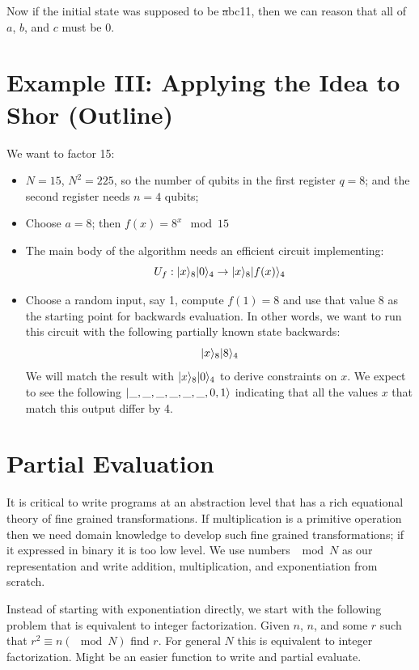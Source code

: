 \documentclass{article}
\begin{document}
Now if the initial state was supposed to be \st{a}{b}{c}{1}{1}, then we
can reason that all of $a$, $b$, and $c$ must be 0.

\section{Example III: Applying the Idea to Shor (Outline)}

We want to factor 15:
\begin{itemize}
\item $N = 15$, $N^2 = 225$, so the number of qubits in the first
  register $q=8$; and the second register needs $n=4$ qubits;
\item Choose $a=8$; then $f(x) = 8^x \mod{15}$
\item The main body of the algorithm needs an efficient circuit implementing:
  \[
  U_f : | x \rangle_8| 0 \rangle_4 \rightarrow | x \rangle_8| f(x) \rangle_4
  \]
\item Choose a random input, say 1, compute $f(1) = 8$ and use that
  value 8 as the starting point for backwards evaluation. In other
  words, we want to run this circuit with the following partially
  known state backwards:
  \[
  | x \rangle_8| 8 \rangle_4
  \]
  We will match the result with $| x \rangle_8| 0 \rangle_4$ to derive
  constraints on $x$. We expect to see the following
  $| \_,\_,\_,\_,\_,\_,0,1 \rangle$ indicating that all the values $x$ that match
  this output differ by 4.
\end{itemize}


\section{Partial Evaluation}

It is critical to write programs at an abstraction level that has a
rich equational theory of fine grained transformations. If
multiplication is a primitive operation then we need domain knowledge
to develop such fine grained transformations; if it expressed in
binary it is too low level. We use numbers $\mod{N}$ as our
representation and write addition, multiplication, and exponentiation
from scratch.


Instead of starting with exponentiation directly, we start with the
following problem that is equivalent to integer factorization. Given
$n$, $n$, and some $r$ such that $r^2 \equiv n (\mod{N})$ find
$r$. For general $N$ this is equivalent to integer
factorization. Might be an easier function to write and partial
evaluate.


\end{document}
